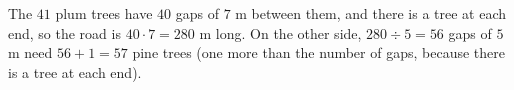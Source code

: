 The $41$ plum trees have $40$ gaps of $7$ m between them, and there is a tree at each end, so the road is $40\cdot7=280$ m long. On the other side, $280\div5=56$ gaps of $5$ m need $56+1=\boxed{57}$ pine trees (one more than the number of gaps, because there is a tree at each end).

